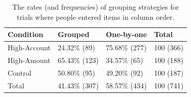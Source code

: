  
\begin{table}[]
\centering
\begin{tabular}{|l|l|l|l|}
\hline
Condition    & Grouped       & One-by-one    & Total     \\ \hline
High-Account & 24.32\% {\footnotesize (89)}     & 75.68\% {\footnotesize (277)}    & 100 {\footnotesize (366)} \\ \hline
High-Amount  & 65.43\% {\footnotesize (123)} & 34.57\% {\footnotesize (65)}  & 100 {\footnotesize (188)} \\ \hline
Control      & 50.80\% {\footnotesize (95)}  & 49.20\% {\footnotesize (92)}  & 100 {\footnotesize (187)} \\ \hline
Total        & 41.43\% {\footnotesize (307)} & 58.57\% {\footnotesize (434)} & 100 {\footnotesize (741)} \\ \hline
\end{tabular}
\caption{The rates (and frequencies) of grouping strategies for trials where people entered items in column order.}\label{table:ch34_group-column}
\end{table}


